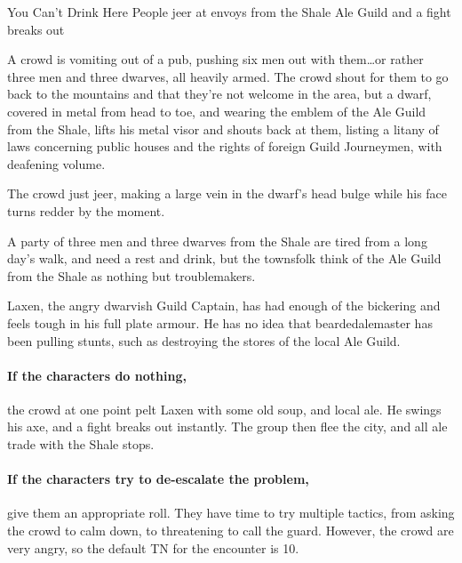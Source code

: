 \begin{multicols}{2}
{You Can't Drink Here}%
{People jeer at envoys from the Shale Ale Guild and a fight breaks out}%

\begin{boxtext}

  A crowd is vomiting out of a pub, pushing six men out with them\ldots or rather three men and three dwarves, all heavily armed.
  The crowd shout for them to go back to the mountains and that they're not welcome in the area, but a dwarf, covered in metal from head to toe, and wearing the emblem of the Ale Guild from the Shale, lifts his metal visor and shouts back at them, listing a litany of laws concerning public houses and the rights of foreign Guild Journeymen, with deafening volume.

  The crowd just jeer, making a large vein in the dwarf's head bulge while his face turns redder by the moment.

\end{boxtext}

A party of three men and three dwarves from the Shale are tired from a long day's walk, and need a rest and drink, but the townsfolk think of the Ale Guild from the Shale as nothing but troublemakers.

Laxen, the angry dwarvish Guild Captain, has had enough of the bickering and feels tough in his full plate armour.
He has no idea that \gls{beardedalemaster} has been pulling stunts, such as destroying the stores of the local Ale Guild.

\paragraph{If the characters do nothing,}
the crowd at one point pelt Laxen with some old soup, and local ale.
He swings his axe, and a fight breaks out instantly.
The group then flee the city, and all ale trade with the Shale stops.

\paragraph{If the characters try to de-escalate the problem,}
give them an appropriate roll.
They have time to try multiple tactics, from asking the crowd to calm down, to threatening to call the guard.
However, the crowd are very angry, so the default TN for the encounter is 10.



\end{multicols}
